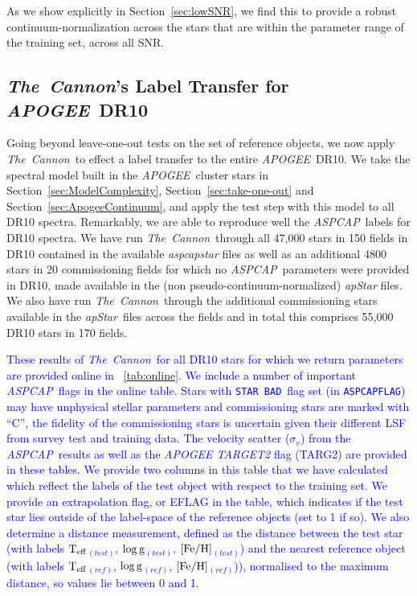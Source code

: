 \documentclass[12pt, preprint]{aastex}
\newcommand{\sectionname}{Section}
\newcommand{\tc}{\textsl{The~Cannon}}
\newcommand{\apogee}{\textsl{APOGEE}}
\newcommand{\aspcap}{\textsl{ASPCAP}}
\newcommand{\badstar}{\texttt{STAR BAD}}
\newcommand{\aspcapflag}{\texttt{ASPCAPFLAG}}
\newcommand{\apstar}{\textsl{apStar}}
\newcommand{\teff}{\mbox{$\rm T_{eff}$}}
\newcommand{\feh}{\mbox{$\rm [Fe/H]$}}
\newcommand{\logg}{\mbox{$\rm \log g$}}
\begin{document}
As we show explicitly in \sectionname~\ref{sec:lowSNR}, we find this to provide a robust continuum-normalization across the stars that are within the parameter range of the training set, across all SNR. 

\subsection{\tc 's Label Transfer for \apogee\ DR10}
\label{sec:APOGEE_DR10_comparison}

Going beyond leave-one-out tests on the set of reference objects, we now apply \tc\ to effect a label transfer to the entire \apogee\ DR10.
We take the spectral model built in the \apogee\ cluster stars in \sectionname~\ref{sec:ModelComplexity}, \sectionname~\ref{sec:take-one-out} and \sectionname~\ref{sec:ApogeeContinuum},
and apply the test step with this model to all DR10 spectra.
Remarkably, we are able to reproduce well the \aspcap\ labels for DR10 spectra. We have run \tc\ through all 47,000 stars in 150 fields in DR10 contained in the available \textit{aspcapstar} files as well as an additional 4800 stars in 20 commissioning fields for which no \aspcap\ parameters were provided in DR10, 
made available in the (non pseudo-continuum-normalized) \textit{apStar} files. 
We also have run \tc\ through the additional commissioning stars available in the \apstar\ files across the fields and in total this
 comprises 55,000 DR10 stars in 170 fields. 

\textcolor{blue}{These results of \tc\ for all DR10 stars for which we return parameters are provided online in \tablename~\ref{tab:online}. 
We include a number of  important \aspcap\ flags in the online table. Stars with \badstar\ flag set (in \aspcapflag) may have unphysical stellar parameters and commissioning stars are marked with ``C'', the fidelity of the commissioning stars is uncertain given their different LSF from survey test and training data. The velocity scatter ($\sigma_v$) from the \aspcap\ results as well as the \textit{APOGEE TARGET2} flag (TARG2) are provided in these tables. We provide two columns in this table that we have calculated which reflect the labels of the test object with respect to the training set. We provide an extrapolation flag, or EFLAG in the table, which indicates if the test star lies outside of the label-space of the reference objects (set to 1 if so). We also determine a distance measurement, defined as the distance between the test star (with labels 
\teff$_{(test)}$,  \logg$_{(test)}$, \feh$_{(test)}$) and the nearest reference object (with labels \teff$_{(ref)}$,  \logg$_{(ref)}$, \feh$_{(ref)}$)), normalised to the maximum distance, so values lie between 0 and 1. }
\end{document}
